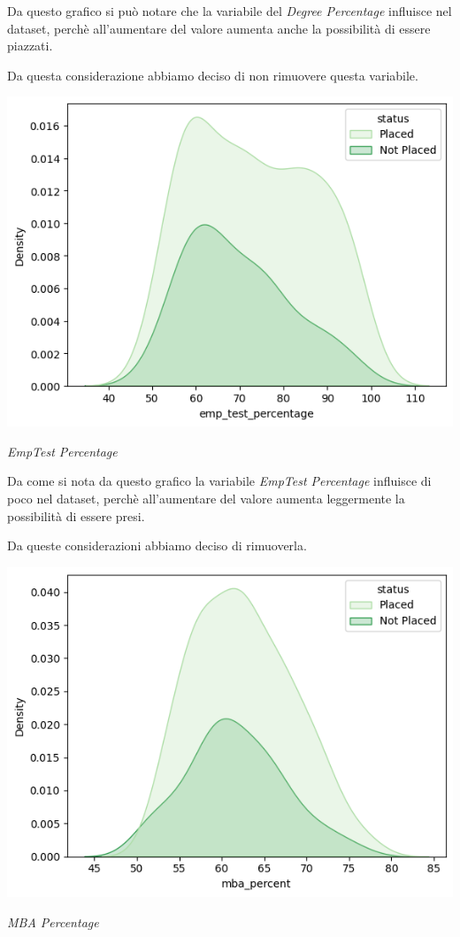 \documentclass[12pt]{article}
\begin{document}
Da questo grafico si può notare che la variabile del \textit{Degree Percentage} influisce nel dataset, perchè all'aumentare del valore aumenta anche la possibilità
di essere piazzati. 

Da questa considerazione abbiamo deciso di non rimuovere questa variabile. 

\begin{center}
    \includegraphics[scale=0.5]{emptestpercentage.png}

    \textit{EmpTest Percentage}
\end{center}

Da come si nota da questo grafico la variabile \textit{EmpTest Percentage} influisce di poco nel dataset, perchè all'aumentare del valore aumenta leggermente la possibilità
di essere presi.

Da queste considerazioni abbiamo deciso di rimuoverla.

\begin{center}
    \includegraphics[scale=0.5]{mbapercentage.png}

    \textit{MBA Percentage}
\end{center}
\end{document}
